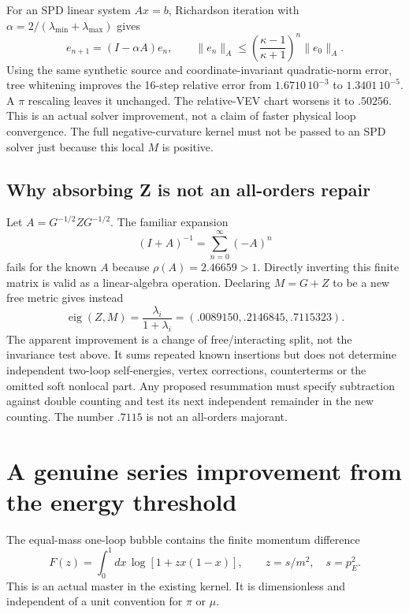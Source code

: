 \documentclass[11pt]{article}
\begin{document}
For an SPD linear system $Ax=b$, Richardson iteration with
$\alpha=2/(\lambda_{\min}+\lambda_{\max})$ gives
\begin{equation}
 e_{n+1}=(I-\alpha A)e_n,\qquad
 \|e_n\|_A\le
 \left(\frac{\kappa-1}{\kappa+1}\right)^n\|e_0\|_A.
\end{equation}
Using the same synthetic source and coordinate-invariant quadratic-norm
error, tree whitening improves the 16-step relative error from
$1.6710\,10^{-3}$ to $1.3401\,10^{-5}$. A $\pi$ rescaling leaves it
unchanged. The relative-VEV chart worsens it to $.50256$.
This is an actual solver improvement, not a claim of faster physical
loop convergence. The full negative-curvature kernel must not be
passed to an SPD solver just because this local $M$ is positive.

\subsection{Why absorbing Z is not an all-orders repair}
Let $A=G^{-1/2}ZG^{-1/2}$. The familiar expansion
\begin{equation}
 (I+A)^{-1}=\sum_{n=0}^\infty(-A)^n
\end{equation}
fails for the known $A$ because $\rho(A)=2.46659>1$. Directly inverting
this finite matrix is valid as a linear-algebra operation. Declaring
$M=G+Z$ to be a new free metric gives instead
\begin{equation}
 \operatorname{eig}(Z,M)=\frac{\lambda_i}{1+\lambda_i}
       =(.0089150,.2146845,.7115323).
\end{equation}
The apparent improvement is a change of free/interacting split, not
the invariance test above. It sums repeated known insertions but does
not determine independent two-loop self-energies, vertex corrections,
counterterms or the omitted soft nonlocal part. Any proposed resummation
must specify subtraction against double counting and test its next
independent remainder in the new counting. The number $.7115$ is not
an all-orders majorant.

\section{A genuine series improvement from the energy threshold}
The equal-mass one-loop bubble contains the finite momentum difference
\begin{equation}
 F(z)=\int_0^1dx\,\log[1+zx(1-x)],\qquad z=s/m^2,\quad s=p_E^2.
\end{equation}
This is an actual master in the existing kernel. It is dimensionless
and independent of a unit convention for $\pi$ or $\mu$.
\end{document}
